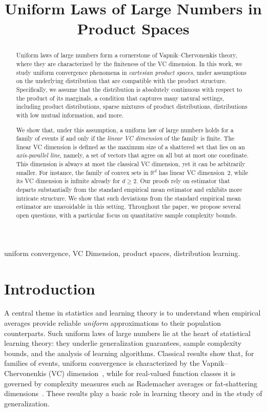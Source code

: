 \documentclass[arxiv]{colt2026}
\title[Uniform Laws of Large Numbers in Product Spaces]{Uniform Laws of Large Numbers in Product Spaces}
\begin{document}
\maketitle
\begin{abstract}

Uniform laws of large numbers form a cornerstone of Vapnik--Chervonenkis theory, where they are characterized by the finiteness of the VC dimension. In this work, we study uniform convergence phenomena in \emph{cartesian product spaces}, under assumptions on the underlying distribution that are compatible with the product structure. Specifically, we assume that the distribution is absolutely continuous with respect to the product of its marginals, a condition that captures many natural settings, including product distributions, sparse mixtures of product distributions, distributions with low mutual information, and more.

We show that, under this assumption, a uniform law of large numbers holds for a family of events if and only if the \emph{linear VC dimension} of the family is finite. The linear VC dimension is defined as the maximum size of a shattered set that lies on an \emph{axis-parallel line}, namely, a set of vectors that agree on all but at most one coordinate. This dimension is always at most the classical VC dimension, yet it can be arbitrarily smaller.
For instance, the family of convex sets in $\mathbb{R}^d$ has linear VC dimension~$2$, while its VC dimension is infinite already for $d\ge 2$. Our proofs rely on estimator that departs substantially from the standard empirical mean estimator and exhibits more intricate structure. We show that such deviations {from the standard empirical mean estimator} are unavoidable in this setting. 
Throughout the paper, we propose several open questions, with a particular focus on quantitative sample complexity bounds.

\end{abstract}

\begin{keywords}
uniform convergence, VC Dimension, product spaces, distribution learning.
\end{keywords}

\section{Introduction}

A central theme in statistics and learning theory is to understand when empirical averages provide reliable \emph{uniform} approximations to their population counterparts. Such uniform laws of large numbers lie at the heart of statistical learning theory: they underlie generalization guarantees, sample complexity bounds, and the analysis of learning algorithms. Classical results show that, for families of events, uniform convergence is characterized by the Vapnik--Chervonenkis (VC) dimension~\cite{vapnik1971}, while for real-valued function classes it is governed by complexity measures such as Rademacher averages or fat-shattering dimensions~\cite{kearns1994,alon1997,bartlett1998}. These results play a basic role in learning theory and in the study of generalization.
\end{document}
